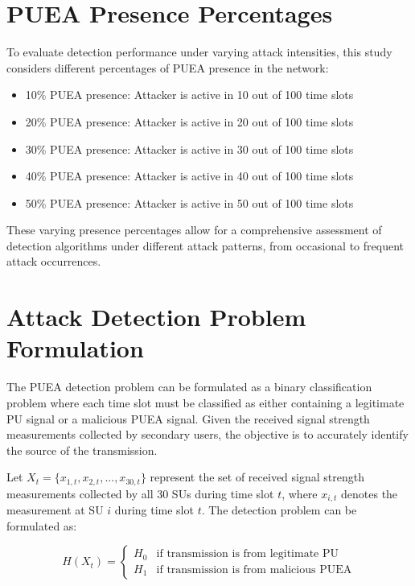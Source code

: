 \section{PUEA Presence Percentages}

To evaluate detection performance under varying attack intensities, this study considers different percentages of PUEA presence in the network:

\begin{itemize}
    \item 10\% PUEA presence: Attacker is active in 10 out of 100 time slots
    \item 20\% PUEA presence: Attacker is active in 20 out of 100 time slots
    \item 30\% PUEA presence: Attacker is active in 30 out of 100 time slots
    \item 40\% PUEA presence: Attacker is active in 40 out of 100 time slots
    \item 50\% PUEA presence: Attacker is active in 50 out of 100 time slots
\end{itemize}

These varying presence percentages allow for a comprehensive assessment of detection algorithms under different attack patterns, from occasional to frequent attack occurrences.

\section{Attack Detection Problem Formulation}

The PUEA detection problem can be formulated as a binary classification problem where each time slot must be classified as either containing a legitimate PU signal or a malicious PUEA signal. Given the received signal strength measurements collected by secondary users, the objective is to accurately identify the source of the transmission.

Let $X_t = \{x_{1,t}, x_{2,t}, ..., x_{30,t}\}$ represent the set of received signal strength measurements collected by all 30 SUs during time slot $t$, where $x_{i,t}$ denotes the measurement at SU $i$ during time slot $t$. The detection problem can be formulated as:

\begin{equation}
    H(X_t) = 
    \begin{cases}
        H_0 & \text{if transmission is from legitimate PU} \\
        H_1 & \text{if transmission is from malicious PUEA}
    \end{cases}
\end{equation}

